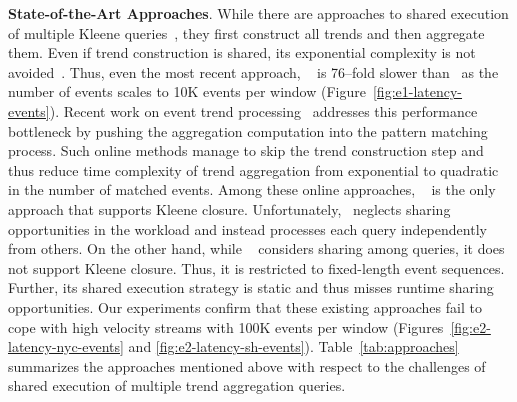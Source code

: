 \textbf{State-of-the-Art Approaches}. 
While there are approaches to shared execution of multiple Kleene queries~\cite{hong2009rule,KS19}, they first construct all trends and then aggregate them. Even if trend construction is shared, its exponential complexity is not avoided~\cite{PLAR17,ZDI14}. Thus, even the most recent approach, \mcep~\cite{KS19} is 76--fold slower than \app\ as the number of events scales to 10K events per window (Figure~\ref{fig:e1-latency-events}).
%
Recent work on event trend processing~\cite{PLRM18,PLRM19,PRLRM18} addresses this performance bottleneck by pushing the aggregation computation into the pattern matching process. Such online methods manage to skip the trend construction step and thus reduce time complexity of trend aggregation from exponential to quadratic in the number of matched events. Among these online approaches, \greta~\cite{PLRM18} is the only approach that supports Kleene closure. Unfortunately, \greta\ neglects sharing opportunities in the workload and instead processes each query independently from others.
On the other hand, while \sharon~\cite{PRLRM18} considers  sharing among  queries, it does not support Kleene closure. Thus, it is restricted to fixed-length event sequences. Further, its shared execution strategy is static and thus misses runtime sharing opportunities. Our experiments confirm that these existing approaches fail to cope with high velocity streams with 100K events per window (Figures~\ref{fig:e2-latency-nyc-events} and \ref{fig:e2-latency-sh-events}). Table~\ref{tab:approaches} summarizes the approaches mentioned above with respect to the challenges of shared execution of multiple trend aggregation queries.




